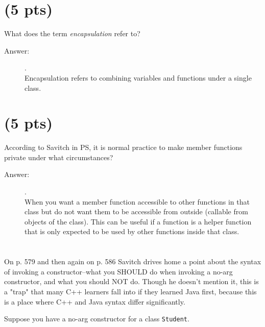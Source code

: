 \documentclass[11pt]{article}
\begin{document}
\newpage

\section{(5 pts)}
\label{sec:org6372af0}
What does the term \emph{encapsulation} refer to?
\begin{description}
    \item[Answer:] .\\
    Encapsulation refers to combining variables and functions under a single class.
\end{description}
\vspace{6em}

\section{(5 pts)}
\label{sec:org66c5004}
According to Savitch in PS, it is normal practice to make member
functions private under what circumstances?
\begin{description}
    \item[Answer:] .\\
    When you want a member function accessible to other functions in that class but do not want them to be accessible from outside (callable from objects of the class). This can be useful if a function is a helper function that is only expected to be used by other functions inside that class.
\end{description}
\newpage

\section{}
\label{sec:orgeb87943}

On p. 579 and then again on p. 586 Savitch drives home a point about
the syntax of invoking a constructor--what you SHOULD do when invoking
a no-arg constructor, and what you should NOT do. Though he doesn't
mention it, this is a "trap" that many C++ learners fall into if they
learned Java first, because this is a place where C++ and Java syntax
differ significantly.

Suppose you have a no-arg constructor for a class \texttt{Student}.   
\end{document}
